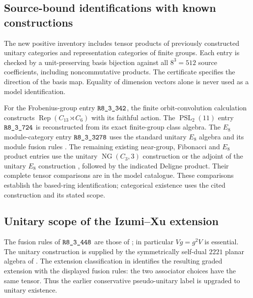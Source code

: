 \subsection{Source-bound identifications with known constructions}
The new positive inventory includes tensor products of previously
constructed unitary categories and representation categories of finite
groups. Each entry is checked by a unit-preserving basis bijection against
all $8^3=512$ source coefficients, including noncommutative products.
The certificate specifies the direction of the basis map. Equality of
dimension vectors alone is never used as a model identification.

For the Frobenius-group entry $\sha{R8_3_342}$, the finite orbit-convolution
calculation constructs $\operatorname{Rep}(C_{13}\rtimes C_6)$ with its
faithful action. The $\operatorname{PSL}_2(11)$ entry
$\sha{R8_3_724}$ is reconstructed from its exact finite-group class algebra.
The $E_8$ module-category entry $\sha{R8_3_3278}$ uses the standard unitary
$E_8$ algebra and its module fusion rules \cite{KO}. The remaining existing
near-group, Fibonacci and $E_8$ product entries use the unitary
$\operatorname{NG}(C_3,3)$ construction
\cite[Proposition~A.4.1]{CMSIzumiXu} or the adjoint of the unitary
$E_8$ construction \cite{KO}, followed by the indicated Deligne product.
Their complete tensor comparisons are in the model catalogue.
These comparisons establish the based-ring identification;
categorical existence uses the cited construction and its stated scope.

\subsection{Unitary scope of the Izumi--Xu extension}
The fusion rules of $\sha{R8_3_448}$ are those of \cite[Appendix~A.6.1]{CMSIzumiXu}; in particular $Vg=g^2V$ is essential. The unitary construction is supplied by the symmetrically self-dual $2221$ planar algebra of \cite[Section~5.1, Theorem~5.5]{MorrisonPenneysSpokes}. The extension classification in \cite[Theorem~4.9, Remarks~4.10--4.11]{GJSCyclic} identifies the resulting graded extension with the displayed fusion rules: the two associator choices have the same tensor. Thus the earlier conservative pseudo-unitary label is upgraded to unitary existence.


